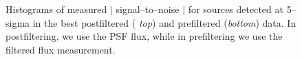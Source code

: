 \documentclass[prd, nofootinbib, floatfix, 11pt,tightenlines,times]{article}
\begin{document}
\begin{figure}
\begin{center}
 \\
 \\
\end{center}
\caption{Histograms of measured $|$ signal--to--noise $|$
  for sources detected at 5--sigma in the best postfiltered ({\it
    top}) and prefiltered ({\it bottom}) data.  In postfiltering, we
  use the PSF flux, while in prefiltering we use the filtered flux
  measurement.  }
\label{fluxerr}
\end{figure}
\end{document}
